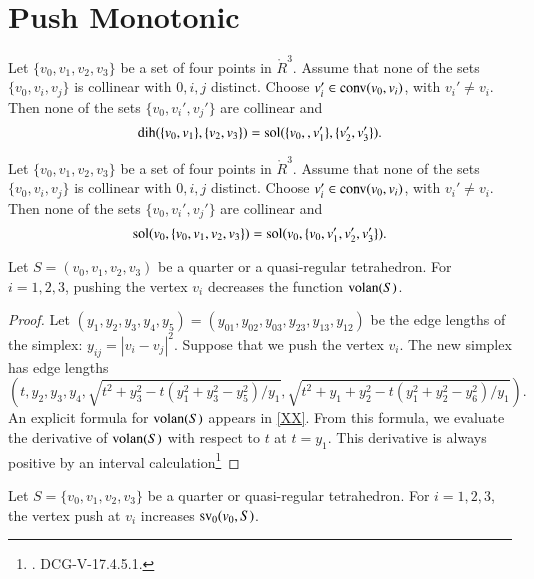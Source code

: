 \section{Push Monotonic}


\begin{lemma}
Let $\{v_0,v_1,v_2,v_3\}$ be a set of four points in $\ring{R}^3$.
Assume that none of the sets $\{v_0,v_i,v_j\}$ is collinear with
$0,i,j$ distinct.   Choose
$v'_i\in{\operatorname{conv}}(v_0,v_i)$, with $v_i'\ne v_i$.  Then
none of the sets $\{v_0,v_i',v_j'\}$ are collinear and
  $$\operatorname{dih}(\{v_0,v_1\},\{v_2,v_3\}) = \operatorname{sol}(\{v_0,,v'_1\},\{v'_2,v'_3\}).$$
\end{lemma}

\begin{lemma}
Let $\{v_0,v_1,v_2,v_3\}$ be a set of four points in $\ring{R}^3$.
Assume that none of the sets $\{v_0,v_i,v_j\}$ is collinear with
$0,i,j$ distinct.   Choose
$v'_i\in{\operatorname{conv}}(v_0,v_i)$, with $v_i'\ne v_i$.  Then
none of the sets $\{v_0,v_i',v_j'\}$ are collinear and
  $$\operatorname{sol}(v_0,\{v_0,v_1,v_2,v_3\}) = \operatorname{sol}(v_0,\{v_0,v'_1,v'_2,v'_3\}).$$
\end{lemma}


\begin{lemma}  
Let $S= (v_0,v_1,v_2,v_3)$ be a quarter
or a quasi-regular tetrahedron.  For  $i=1,2,3$,
pushing the vertex $v_i$ decreases the function ${\operatorname{volan}}(S)$.
\end{lemma}

\begin{proof}  
Let $(y_1,y_2,y_3,y_4,y_5) = (y_{01},y_{02},y_{03},y_{23},y_{13},y_{12})$ 
be the edge lengths of the simplex: $y_{ij} = |v_i-v_j|^2$.
Suppose that we push the vertex $v_i$.  The new simplex has edge
lengths
$$
\left(t,y_2,y_3,y_4,\sqrt{t^2+y_3^2 - t(y_1^2+y_3^2-y_5^2)/y_1},
\sqrt{t^2 + y_1 + y_2^2 - t(y_1^2+y_2^2-y_6^2)/y_1}\right).
$$
An explicit formula for ${\operatorname{volan}}(S)$ appears in
\ref{XX}.  From this formula, 
we evaluate the derivative of ${\operatorname{volan}}(S)$ with respect
to $t$ at $t=y_1$.   This derivative is always positive by
an interval calculation\footnote{.  DCG-V-17.4.5.1.}
\end{proof}

\begin{lemma}
Let $S=\{v_0,v_1,v_2,v_3\}$ be a quarter or quasi-regular tetrahedron.
For $i=1,2,3$, the vertex push at $v_i$ increases
${\operatorname{sv}}_0(v_0,S)$.
\end{lemma}

